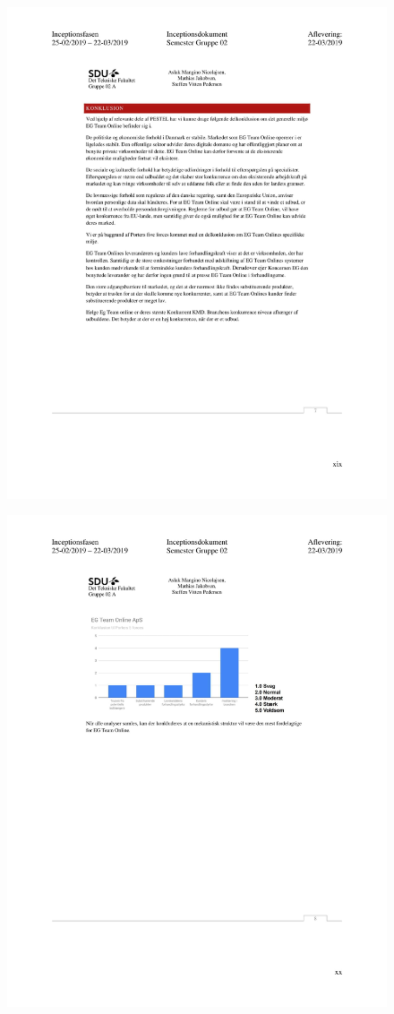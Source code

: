 \begin{figure}[hb]
  \includegraphics[scale = 0.33]{./PNG/Inceptions/Gruppe02+InceptionsDokument-52.jpg} 
\end{figure}

\begin{figure}[hb]
  \includegraphics[scale = 0.33]{./PNG/Inceptions/Gruppe02+InceptionsDokument-53.jpg} 
\end{figure}
